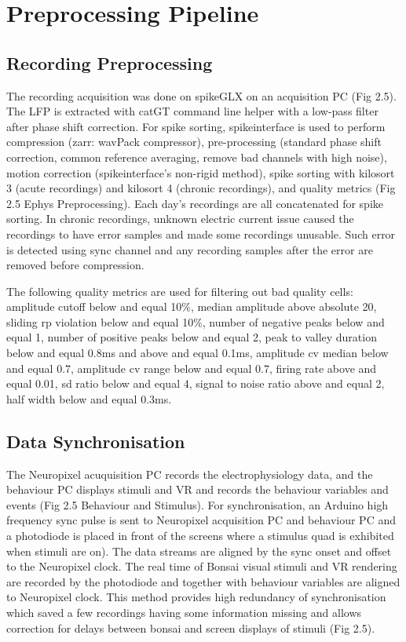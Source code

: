 \section{Preprocessing Pipeline}
\subsection{Recording Preprocessing}
The recording acquisition was done on spikeGLX on an acquisition PC (Fig 2.5). The LFP is extracted with catGT command line helper with a low-pass filter after phase shift correction. For spike sorting, spikeinterface is used to perform compression (zarr: wavPack compressor), pre-processing (standard phase shift correction, common reference averaging, remove bad channels with high noise), motion correction (spikeinterface's non-rigid method), spike sorting with kilosort 3 (acute recordings) and kilosort 4 (chronic recordings), and quality metrics (Fig 2.5 Ephys Preprocessing). Each day's recordings are all concatenated for spike sorting. In chronic recordings, unknown electric current issue caused the recordings to have error samples and made some recordings unusable. Such error is detected using sync channel and any recording samples after the error are removed before compression.

The following quality metrics are used for filtering out bad quality cells: amplitude cutoff below and equal 10\%, median amplitude above absolute 20, sliding rp violation below and equal 10\%, number of negative peaks below and equal 1, number of positive peaks below and equal 2, peak to valley duration below and equal  0.8ms and above and equal 0.1ms, amplitude cv median below and equal 0.7, amplitude cv range below and equal 0.7, firing rate above and equal 0.01, sd ratio below and equal 4, signal to noise ratio above and equal 2, half width below and equal 0.3ms.

\subsection{Data Synchronisation}
The Neuropixel acuquisition PC records the electrophysiology data, and the behaviour PC displays stimuli and VR and records the behaviour variables and events (Fig 2.5 Behaviour and Stimulus). For synchronisation, an Arduino high frequency sync pulse is sent to Neuropixel acquisition PC and behaviour PC and a photodiode is placed in front of the screens where a stimulus quad is exhibited when stimuli are on). The data streams are aligned by the sync onset and offset to the Neuropixel clock. The real time of Bonsai visual stimuli and VR rendering are recorded by the photodiode and together with behaviour variables are aligned to Neuropixel clock. This method provides high redundancy of synchronisation which saved a few recordings having some information missing and allows correction for delays between bonsai and screen displays of stimuli (Fig 2.5). 

